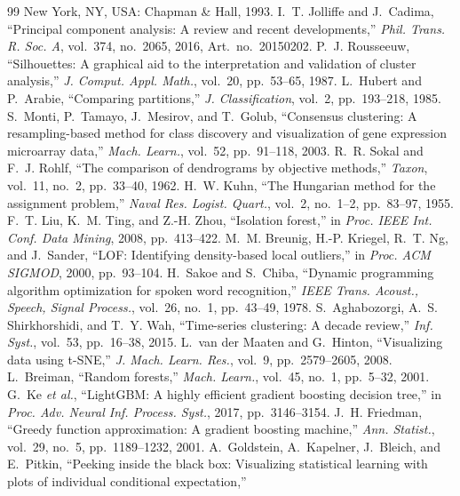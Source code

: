 \documentclass[conference,a4paper]{IEEEtran}
\begin{document}
\begin{thebibliography}{99}
New York, NY, USA: Chapman \& Hall, 1993.
 I.~T. Jolliffe and J.~Cadima, ``Principal component analysis: A review and
recent developments,'' \emph{Phil. Trans. R. Soc. A}, vol.~374, no.~2065, 2016, Art.~no.~20150202.
 P.~J. Rousseeuw, ``Silhouettes: A graphical aid to the interpretation and
validation of cluster analysis,'' \emph{J. Comput. Appl. Math.}, vol.~20, pp.~53--65, 1987.
 L.~Hubert and P.~Arabie, ``Comparing partitions,'' \emph{J. Classification},
vol.~2, pp.~193--218, 1985.
 S.~Monti, P.~Tamayo, J.~Mesirov, and T.~Golub, ``Consensus clustering: A
resampling-based method for class discovery and visualization of gene expression microarray data,''
\emph{Mach. Learn.}, vol.~52, pp.~91--118, 2003.
 R.~R. Sokal and F.~J. Rohlf, ``The comparison of dendrograms by objective
methods,'' \emph{Taxon}, vol.~11, no.~2, pp.~33--40, 1962.
 H.~W. Kuhn, ``The Hungarian method for the assignment problem,''
\emph{Naval Res. Logist. Quart.}, vol.~2, no.~1--2, pp.~83--97, 1955.
 F.~T. Liu, K.~M. Ting, and Z.-H. Zhou, ``Isolation forest,'' in \emph{Proc.
IEEE Int. Conf. Data Mining}, 2008, pp.~413--422.
 M.~M. Breunig, H.-P. Kriegel, R.~T. Ng, and J.~Sander, ``LOF: Identifying
density-based local outliers,'' in \emph{Proc. ACM SIGMOD}, 2000, pp.~93--104.
 H.~Sakoe and S.~Chiba, ``Dynamic programming algorithm optimization for
spoken word recognition,'' \emph{IEEE Trans. Acoust., Speech, Signal Process.}, vol.~26, no.~1, pp.~43--49, 1978.
 S.~Aghabozorgi, A.~S. Shirkhorshidi, and T.~Y. Wah, ``Time-series
clustering: A decade review,'' \emph{Inf. Syst.}, vol.~53, pp.~16--38, 2015.
 L.~van der Maaten and G.~Hinton, ``Visualizing data using t-SNE,''
\emph{J. Mach. Learn. Res.}, vol.~9, pp.~2579--2605, 2008.
 L.~Breiman, ``Random forests,'' \emph{Mach. Learn.}, vol.~45, no.~1,
pp.~5--32, 2001.
 G.~Ke \emph{et al.}, ``LightGBM: A highly efficient gradient boosting
decision tree,'' in \emph{Proc. Adv. Neural Inf. Process. Syst.}, 2017, pp.~3146--3154.
 J.~H. Friedman, ``Greedy function approximation: A gradient boosting
machine,'' \emph{Ann. Statist.}, vol.~29, no.~5, pp.~1189--1232, 2001.
 A.~Goldstein, A.~Kapelner, J.~Bleich, and E.~Pitkin, ``Peeking inside the
black box: Visualizing statistical learning with plots of individual conditional expectation,''

\end{thebibliography}
\end{document}

